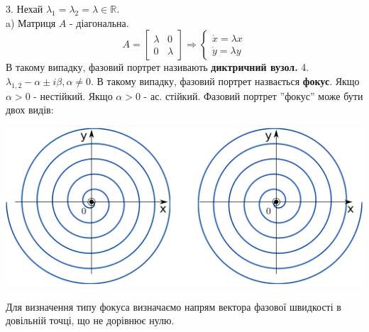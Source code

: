     3. Нехай $ \lambda_1 = \lambda_2 = \lambda \in \mathbb{R}$.\\
    a) Матриця $A$ - діагональна.
    $$
    A = \begin{bmatrix}
     \lambda & 0 \\
     0 & \lambda
    \end{bmatrix} \Longrightarrow \begin{cases}
        \dot{x} = \lambda x\\
        \dot{y} = \lambda y
    \end{cases}
    $$
    В такому випадку, фазовий портрет називають \textbf{диктричний вузол.}
    4. $\lambda_{1, 2} - \alpha \pm i\beta, \alpha\neq 0$. В такому випадку, фазовий портрет назвається \textbf{фокус}. Якщо $ \alpha > 0$ - нестійкий. Якщо $ \alpha > 0$ - ас. стійкий.
    Фазовий портрет ''фокус'' може бути двох видів:
    \begin{center} \includegraphics[scale=0.3]{assets/lectures_recent-9fe11a21.png} \end{center}
    Для визначення типу фокуса визначаємо напрям вектора фазової швидкості в довільній точці, що не дорівнює нулю.

